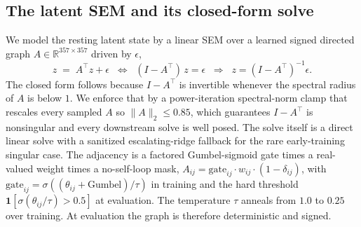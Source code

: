 \subsection{The latent SEM and its closed-form solve}
We model the resting latent state by a linear SEM over a learned signed directed graph
$A\in\mathbb{R}^{357\times357}$ driven by $\epsilon$,
\begin{equation}
z \;=\; A^{\top} z + \epsilon
\;\;\Longleftrightarrow\;\;
(I-A^{\top})\,z=\epsilon
\;\;\Longrightarrow\;\;
z=(I-A^{\top})^{-1}\epsilon .
\label{eq:sem_solve}
\end{equation}
The closed form follows because $I-A^{\top}$ is invertible whenever the spectral
radius of $A$ is below $1$. We enforce that by a power-iteration spectral-norm clamp
that rescales every sampled $A$ so $\lVert A\rVert_2 \le 0.85$, which guarantees
$I-A^{\top}$ is nonsingular and every downstream solve is well posed. The solve itself
is a direct linear solve with a sanitized escalating-ridge fallback for the rare
early-training singular case. The adjacency is a factored Gumbel-sigmoid gate times a
real-valued weight times a no-self-loop mask,
$A_{ij}=\mathrm{gate}_{ij}\cdot w_{ij}\cdot(1-\delta_{ij})$, with
$\mathrm{gate}_{ij}=\sigma((\theta_{ij}+\text{Gumbel})/\tau)$ in training and the hard
threshold $\mathbf{1}[\sigma(\theta_{ij}/\tau)>0.5]$ at evaluation. The temperature
$\tau$ anneals from $1.0$ to $0.25$ over training. At evaluation the graph is therefore
deterministic and signed.

